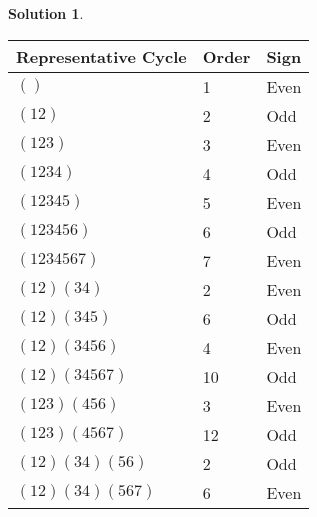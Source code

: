 \documentclass{article}
\theoremstyle{definition}
\newtheorem*{solution}{Solution}
\begin{document}
\begin{enumerate}
\begin{solution}
\begin{tabular}{l|l|l}
Representative Cycle & Order & Sign \\
\hline
$()$ & 1 & Even \\
$(12)$ & 2 & Odd \\
$(123)$ & 3 & Even \\
$(1234)$ & 4 & Odd \\
$(12345)$ & 5 & Even \\
$(123456)$ & 6 & Odd \\
$(1234567)$ & 7 & Even \\
$(12)(34)$ & 2 & Even \\
$(12)(345)$ & 6 & Odd \\
$(12)(3456)$ & 4 & Even \\
$(12)(34567)$ & 10 & Odd \\
$(123)(456)$ & 3 & Even \\
$(123)(4567)$ & 12 & Odd \\
$(12)(34)(56)$ & 2 & Odd \\
$(12)(34)(567)$ & 6 & Even
\end{tabular}


\end{solution}
\end{enumerate}
\end{document}
